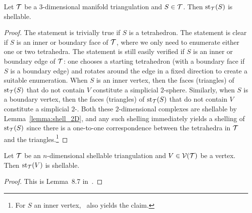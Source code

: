 \documentclass[10pt,a4paper]{article}
\begin{document}
\begin{lemma}
    Let ${\mathcal T}$ be a $3$-dimensional manifold triangulation and $S \in {\mathcal T}$.
    Then $\operatorname{st}_{{\mathcal T}}(S)$ is shellable. 
\end{lemma}
\begin{proof}
    The statement is trivially true if $S$ is a tetrahedron. 
    The statement is clear if $S$ is an inner or boundary face of ${\mathcal T}$,
    where we only need to enumerate either one or two tetrahedra. 
    The statement is still easily verified if $S$ is an inner or boundary edge of ${\mathcal T}$:
    one chooses a starting tetrahedron (with a boundary face if $S$ is a boundary edge) and rotates around the edge in a fixed direction to create a suitable enumeration. 
    When $S$ is an inner vertex, then the faces (triangles) of $\operatorname{st}_{{\mathcal T}}(S)$ that do not contain $V$ constitute a simplicial $2$-sphere.
    Similarly, when $S$ is a boundary vertex, then the faces (triangles) of $\operatorname{st}_{{\mathcal T}}(S)$ that do not contain $V$ constitute a simplicial $2$-\disk.
    Both these $2$-dimensional complexes are shellable by Lemma~\ref{lemma:shell_2D}, and any such shelling immediately yields a shelling of $\operatorname{st}_{{\mathcal T}}(S)$ since there is a one-to-one correspondence between the tetrahedra in ${\mathcal T}$ and the triangles.\footnote{For $S$ an inner vertex,~\cite[Lemma~B.1]{ern2020stable} also yields the claim.}
\end{proof}


\begin{lemma}\label{lemma:stars_are_shellable}
    Let ${\mathcal T}$ be an $n$-dimensional shellable triangulation and $V \in {\mathcal V}({\mathcal T})$ be a vertex.
    Then $\operatorname{st}_{{\mathcal T}}(V)$ is shellable. 
\end{lemma}
\begin{proof}
    This is Lemma~8.7 in~\cite{ziegler1995lectures}.
\end{proof}
\end{document}
